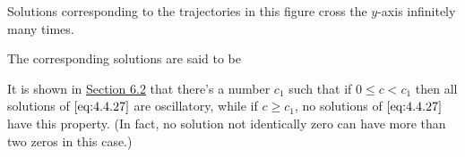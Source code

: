 \documentclass{ximera}
\begin{document}
\begin{center}
\end{center}
 
 
Solutions corresponding to the trajectories in
this figure cross the $y$-axis infinitely many times.



 
 
The corresponding solutions %
are said to be 
 
\begin{center}
\end{center}
 
 
It is shown in \href{https://ximera.osu.edu/ode/main/springProblemsII/springProblemsII}{Section 6.2} that there's a number $c_1$ such that if $0\leq
c<c_1$ then  all solutions of $\eqref{eq:4.4.27}$ are oscillatory, while if
$c\geq c_1$,  no solutions of $\eqref{eq:4.4.27}$ have this property. (In
fact, no solution not identically zero can have more than two zeros in
this case.) 
 
 
\end{document}
